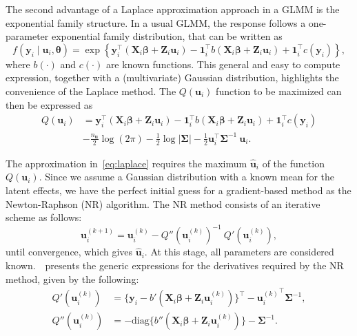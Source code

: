 The second advantage of a Laplace approximation approach in a GLMM is
the exponential family structure. In a usual GLMM, the response follows
a one-parameter exponential family distribution, that can be written as
\[
  f(\mathbf{y}_{i} \mid \mathbf{u}_{i}, \bm{\theta}) = \exp
  \left\{\mathbf{y}_{i}^{\top}
    (\mathbf{X}_{i}\bm{\beta} + \mathbf{Z}_{i}\mathbf{u}_{i}) -
    \mathbf{1}_{i}^{\top}
    b(\mathbf{X}_{i}\bm{\beta} + \mathbf{Z}_{i}\mathbf{u}_{i}) +
    \mathbf{1}_{i}^{\top} c(\mathbf{y}_{i})
  \right\},
\]
where \(b(\cdot)\) and \(c(\cdot)\) are known functions. This general
and easy to compute expression, together with a (multivariate) Gaussian
distribution, highlights the convenience of the Laplace method. The
\(Q(\mathbf{u}_{i})\) function to be maximized can then be expressed as
\begin{equation}
  \begin{aligned}
    Q(\mathbf{u}_{i}) &= \mathbf{y}_{i}^{\top}
    (\mathbf{X}_{i}\bm{\beta} + \mathbf{Z}_{i}\mathbf{u}_{i}) -
    \mathbf{1}_{i}^{\top}
    b(\mathbf{X}_{i}\bm{\beta} + \mathbf{Z}_{i}\mathbf{u}_{i}) +
    \mathbf{1}_{i}^{\top} c(\mathbf{y}_{i})\\
    &- \frac{n_{\mathbf{u}}}{2} \log (2 \pi) -
    \frac{1}{2} \log |\bm{\Sigma}| -
    \frac{1}{2} \mathbf{u}_{i}^{\top} \bm{\Sigma}^{-1}~\mathbf{u}_{i}.
  \end{aligned}
\end{equation}

The approximation in~\autoref{eq:laplace} requires the maximum
\(\mathbf{\hat{u}}_{i}\) of the function \(Q(\mathbf{u}_{i})\). Since we
assume a Gaussian distribution with a known mean for the latent effects,
we have the perfect initial guess for a gradient-based method as the
Newton-Raphson (NR) algorithm. The NR method consists of an iterative
scheme as follows:
\[
  \mathbf{u}_{i}^{(k+1)} = \mathbf{u}_{i}^{(k)} -
  {Q}''(\mathbf{u}_{i}^{(k)})^{-1}~{Q}'(\mathbf{u}_{i}^{(k)}),
\]
until convergence, which gives \(\mathbf{\hat{u}}_{i}\). At this stage,
all parameters are considered known.~~presents the
generic expressions for the derivatives required by the NR method, given
by the following:
\begin{equation}
  \begin{aligned}
    {Q}'(\mathbf{u}_{i}^{(k)}) &= \{\mathbf{y}_{i} -
    {b}'(\mathbf{X}_{i}\bm{\beta} +
    \mathbf{Z}_{i}\mathbf{u}_{i}^{(k)})\}^{\top} -
    {\mathbf{u}_{i}^{(k)}}^{\top} \bm{\Sigma}^{-1},\\
    {Q}''(\mathbf{u}_{i}^{(k)}) &=
    - \text{diag}\{{b}''(\mathbf{X}_{i}\bm{\beta} +
    \mathbf{Z}_{i}\mathbf{u}_{i}^{(k)})\} - \bm{\Sigma}^{-1}.
  \end{aligned}
  \nonumber
\end{equation}

